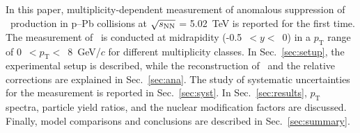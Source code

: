 
In this paper, multiplicity-dependent measurement of anomalous suppression of \fzero~production in p--Pb collisions at $\sqrt{s_{\rm NN}}$ = 5.02~TeV is reported for the first time. The measurement of \fzero~is conducted at midrapidity (-0.5~$<y<$~0) in a $p_{\mathrm{T}}$ range of 0~$<p_{\mathrm{T}}<$~8~GeV/$c$ for different multiplicity classes. In Sec.~\ref{sec:setup}, the experimental setup is described, while the reconstruction of \fzero\ and the relative corrections are explained in Sec.~\ref{sec:ana}. The study of systematic uncertainties for the measurement is reported in Sec.~\ref{sec:syst}. In Sec.~\ref{sec:results}, $p_{\mathrm{T}}$ spectra, particle yield ratios, and the nuclear modification factors are discussed. Finally, model comparisons and conclusions are described in Sec.~\ref{sec:summary}.

\label{sec:intro}



